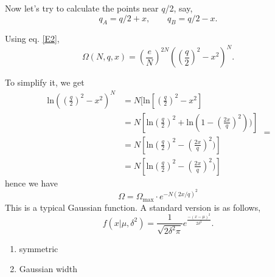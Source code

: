 \documentclass[twoside]{article}
\begin{document}
Now let's try to calculate the points near $q$/2, say,
\begin{equation}
  q_A = q/2+x, ~~~~~~~~~ q_B=q/2-x.
\end{equation}

Using eq. \ref{E2},
\begin{equation} \label{E3}
       \Omega(N,q,x) = (\frac{e}{N})^{2N} ((\frac{q}{2})^2-x^2)^{N}.
\end{equation}

To simplify it, we get
\begin{equation} \label{E4}
\begin{split}
       \text{ln}((\frac{q}{2})^2-x^2)^{N} 
           &= N[\text{ln}[(\frac{q}{2})^2-x^2]\\
           &= N[\text{ln}(\frac{q}{2})^2 + \text{ln}(1-(\frac{2x}{q})^2))]\\
           &= N[\text{ln}(\frac{q}{2})^2 - (\frac{2x}{q})^2)]\\
           &= N[\text{ln}(\frac{q}{2})^2 - (\frac{2x}{q})^2)]
\end{split}                                          =
\end{equation}
hence we have 
\begin{equation} \label{E4}
  \Omega = \Omega_\text{max} \cdot e^{-N(2x/q)^2}
\end{equation}
This is a typical Gaussian function. A standard version is as follows,
\begin{equation}
  f(x|\mu,\delta^2) = \frac{1}{\sqrt{2\delta^2\pi}} e^\frac{-(x-\mu)^2}{2\delta^2}.
\end{equation}

\begin{enumerate}
\item symmetric
\item Gaussian width
\end{enumerate}
\end{document}
